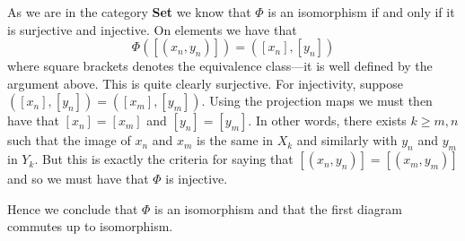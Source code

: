 \documentclass[a4paper]{article}
\begin{document}
\begin{exercise}{2}
As we are in the category \textbf{Set} we know that $ \Phi $ is an isomorphism if and only if it is surjective and injective. On elements we have that
\begin{equation*}
  \Phi([(x_n, y_n)]) = ([x_n], [y_n])
\end{equation*}
where square brackets denotes the equivalence class---it is well defined by the argument above. This is quite clearly surjective. For injectivity, suppose
$ ([x_n], [y_n]) = ([x_m], [y_m]) $. Using the projection maps we must then have that
$ [x_n] = [x_m] $ and $ [y_n] = [y_m] $. In other words, there exists $ k \geq m,n $ such that the image of $ x_n $ and $ x_m $ is the same in $ X_k $ and similarly with $ y_n $ and $ y_m $ in $ Y_k $. But this is exactly the criteria for saying that $ [(x_n, y_n)] = [(x_m, y_m)] $ and so we must have that $ \Phi $ is injective.

Hence we conclude that $ \Phi $ is an isomorphism and that the first diagram commutes up to isomorphism.
\end{exercise}
\end{document}
